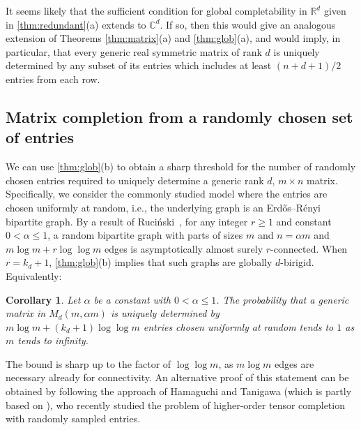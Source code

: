 \documentclass[11pt,a4paper,dvipsnames]{scrartcl}
\newtheorem{corollary}[theorem]{Corollary}
\newcommand{\real}{{\mathbb{R}}}
\newcommand{\complex}{{\mathbb{C}}}
\begin{document}
 It seems likely that the sufficient condition for global completability in $\real^d$ given in \cref{thm:redundant}(a) extends to  $\complex^d$. If so, then this would give an analogous extension of Theorems \ref{thm:matrix}(a) and \ref{thm:glob}(a), and would imply, in particular, that every generic real symmetric matrix of rank $d$ 
is uniquely determined by any subset of its entries which includes at least $(n + d + 1)/2$ entries from each row.

\subsection{Matrix completion from a randomly chosen  set of entries}
We can use \cref{thm:glob}(b) to obtain a sharp threshold 
		for the number of randomly chosen entries required to uniquely determine a generic	
	 rank $d$, $m\times n$ matrix. Specifically, we consider the commonly studied model where the entries are chosen uniformly at random, i.e., the underlying graph is an Erdős--Rényi bipartite graph.
		By a result of Ruciński~\cite{Ruc}, for any integer $r \ge 1$ and constant $0 < \alpha \le 1$, a random bipartite graph 
        with parts of sizes $m$ and $n = \alpha m$ and 
        $m\log m + r\log\log m$ edges is asymptotically almost surely $r$-connected.
		When $r = k_d+1$, \cref{thm:glob}(b) implies that such graphs are globally $d$-birigid. Equivalently:
		\begin{corollary}\label{coro:random:matrix}
			Let $\alpha$ be a constant with $0< \alpha\leq 1$. The probability that a generic matrix in $M_d(m,\alpha m)$ is uniquely determined by $m\log m+(k_d+1)\log\log m$ entries chosen uniformly at random tends to $1$ as $m$ tends to infinity.
		\end{corollary}
		The bound is sharp up to the factor of $\log \log m$, as $m\log m$ edges are necessary already for connectivity. An alternative proof of this statement can be obtained by following the approach of Hamaguchi and Tanigawa \cite{HT2024} (which is partly based on \cite{LNPR}), who recently studied the
        problem of higher-order tensor completion with randomly sampled entries. 
        
\end{document}
